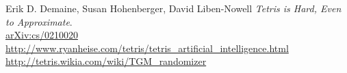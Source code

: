\documentclass[fontsize=12pt]{article}
\begin{document}
\newpage


\begin{thebibliography}{9}
Erik D. Demaine, Susan Hohenberger, David Liben-Nowell
\textit{
Tetris is Hard, Even to Approximate}.
\\\href{https://arxiv.org/abs/cs/0210020}{arXiv:cs/0210020}
  \url{http://www.ryanheise.com/tetris/tetris_artificial_intelligence.html}
  \url{http://tetris.wikia.com/wiki/TGM_randomizer}
\end{thebibliography}
\end{document}
